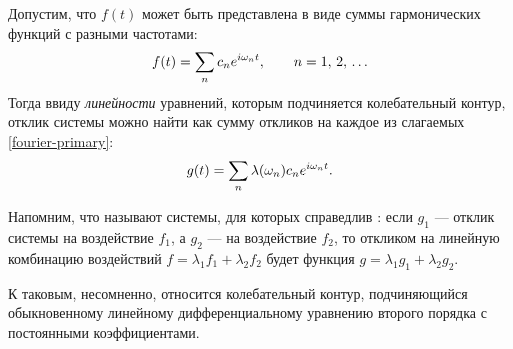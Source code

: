 Допустим, что $f(t)$ может быть представлена в виде суммы гармонических функций
с разными частотами:
\begin{equation}
\eqmark{fourier-primary}
f(t) = \sum_n c_n e^{i\omega_n t},\qquad n=1,\,2,\,\ldots
\end{equation}
Тогда ввиду \emph{линейности} уравнений, которым подчиняется колебательный
контур, отклик системы можно найти как сумму откликов на каждое из 
слагаемых \eqref{fourier-primary}:
\begin{equation}
 \eqmark{fourier-secondary}
 g(t) = \sum_n \lambda(\omega_n) c_n e^{i\omega_n t}.
\end{equation}
\vspace*{-1pc}

\begin{lab:note}
Напомним, что  называют системы, для которых справедлив 
: если $g_1$ --- отклик системы на воздействие 
$f_1$, а $g_2$ --- на воздействие $f_2$, то откликом на линейную комбинацию
воздействий $f=\lambda_1 f_1 + \lambda_2 f_2$ будет функция 
$g=\lambda_1 g_1 + \lambda_2 g_2$.

К таковым, несомненно, относится колебательный контур, подчиняющийся обыкновенному 
линейному дифференциальному уравнению второго порядка с постоянными коэффициентами.
\end{lab:note}







